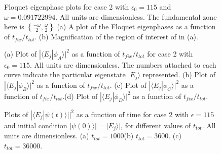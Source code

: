 \documentclass{article}
\begin{document}
\begin{figure} 
\caption{Floquet eigenphase plots for case 2 with $\epsilon_0=115$ and $\omega = 0.091722994$. All units are dimensionless.  The fundamental zone here is $\left\lbrace \frac{-\omega}{2} , \frac{\omega}{2}\right\rbrace $ (a) A  plot of the Floquet eigenphases as a function of $t_{fix}/t_{tot}$. (b) Magnification of the region of interest of in (a).}
\label{fig:phase_case02}
\end{figure}

\begin{figure}
\caption{(a) Plot of $|{\langle}E_j|{\phi}_A{\rangle}|^2$ as a function of $t_{fix}/t_{tot}$ for case 2 with $\epsilon_0 = 115$. All units are dimensionless.  The numbers attached to each curve indicate the particular eigenstate $|E_j{\rangle}$ represented.  (b) Plot of $|{\langle}E_j|{\phi}_B{\rangle}|^2$ as a function of $t_{fix}/t_{tot}$. (c) Plot of $|{\langle}E_j|{\phi}_C{\rangle}|^2$ as a function of $t_{fix}/t_{tot}$.(d) Plot of $|{\langle}E_j|{\phi}_D{\rangle}|^2$ as a function of $t_{fix}/t_{tot}$.}
\label{fig:states_case02}
\end{figure}

\begin{figure} 
\caption{Plots of $|{\langle}E_j|{\psi}(t){\rangle|}|^2$ as a function of time for case 2 with $\epsilon=115$  and initial condition $|{\psi}(0){\rangle|}=|E_j{\rangle|}$, for different values of  $t_{tot}$. All units are dimensionless. (a) $t_{tot}=1000$(b) $t_{tot}=3600$. (c) $t_{tot}=36000$.}
\label{fig:e_115timeev_case02}
\end{figure}
\end{document}
